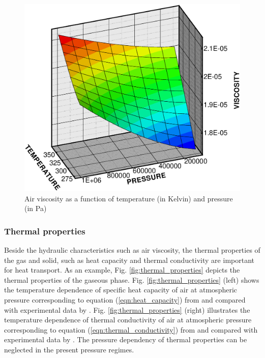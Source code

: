 \begin{figure}[htb!]
\begin{center}
\footnotesize
\includegraphics[width=0.85\columnwidth]{H_GAS/figures/viscosity.eps}  %
\caption{Air viscosity as a function of temperature (in Kelvin) and pressure (in Pa)}
\label{fig:visco7}
\end{center}
\end{figure}
%

\subsubsection{Thermal properties}
\label{sec:thermal_properties}

Beside the hydraulic characteristics such as air viscosity, the thermal properties of the gas and solid, such as heat capacity and thermal conductivity are important for heat transport.
As an example, Fig. \ref{fig:thermal_properties} depicts the thermal properties of the gaseous phase.
Fig. \ref{fig:thermal_properties} (left) shows the temperature dependence of specific heat capacity of air at atmospheric pressure corresponding to equation (\ref{eqn:heat_capacity}) from \cite{ZografosEtAl:1987} and compared with experimental data by \cite{VargaftikEtAl:1996}. Fig. \ref{fig:thermal_properties} (right) illustrates the temperature dependence of thermal conductivity of air at atmospheric pressure corresponding to equation (\ref{eqn:thermal_conductivity}) from \cite{ZografosEtAl:1987}  and compared with experimental data by \cite{VargaftikEtAl:1996}. The pressure dependency of thermal properties can be neglected in the present pressure regimes.

